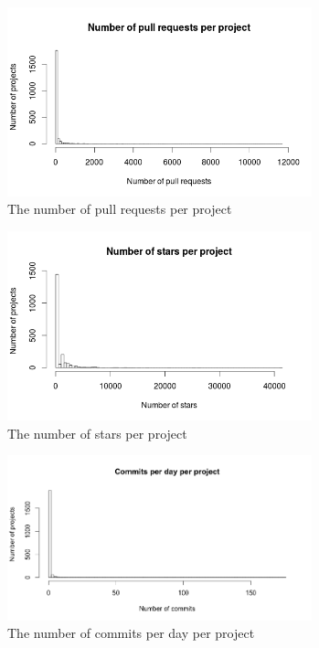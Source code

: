 	    \begin{figure}[t!]
	        \includegraphics[width=250pt]{figures/number-of-pull-requests-per-project}
	        \caption{The number of pull requests per project}
	        \label{fig:nr-pull-requests-plot}
	    \end{figure}

	    \begin{figure}[t!]
	        \includegraphics[width=250pt]{figures/number-of-stars-per-project}
	        \caption{The number of stars per project}
	        \label{fig:nr-stars-plot}
	    \end{figure}

	    \begin{figure}[t!]
	        \includegraphics[width=250pt]{figures/commits-per-day-per-project}
	        \caption{The number of commits per day per project}
	        \label{fig:nr-commits-day-plot}
	    \end{figure}

